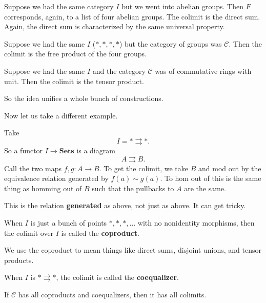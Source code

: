 \begin{example} 
Suppose we had the same category $I$ but we went into abelian groups. Then $F$
corresponds, again, to a list of four abelian groups. The colimit is the direct
sum. Again, the direct sum is characterized by the same universal property. 
\end{example} 

\begin{example} 
Suppose we had the same $I$ ($\ast, \ast, \ast, \ast$) but the category of
groups was $\mathcal{C}$. Then the colimit is the
free product of the four groups. 
\end{example} 

\begin{example} 
Suppose we had the same $I$ and the category $\mathcal{C}$ was of commutative
rings with unit. Then the colimit is the tensor product. 
\end{example} 

So the idea unifies a whole bunch of constructions. 

Now let us take a different example.

\begin{example} 
Take 
\[ I = \ast \rightrightarrows \ast.  \]
So a functor $I \to \mathbf{Sets}$ is a diagram
\[ A \rightrightarrows B.  \]
Call the two maps $f,g: A \to B$. To get the colimit, we take $B$ and mod out
by the equivalence relation generated by $f(a) \sim g(a)$. 
To hom out of this is the same thing as homming  out of $B$ such that the
pullbacks to $A$ are the same. 

This is the relation \textbf{generated} as above, not just as above. It can get
tricky.
\end{example} 

\begin{definition} 
When $I$ is just a bunch of points  $\ast, \ast, \ast, \dots$ with no nonidentity morphisms, then the
colimit over $I$ is called the \textbf{coproduct}.
\end{definition} 

We use the coproduct to mean things like direct sums, disjoint unions, and
tensor products. 

\begin{definition} 
When $I$ is $\ast \rightrightarrows \ast$, the colimit is called the
\textbf{coequalizer}.
\end{definition} 

\begin{theorem} 
If $\mathcal{C}$ has all coproducts and coequalizers, then it has all colimits. 
\end{theorem} 

